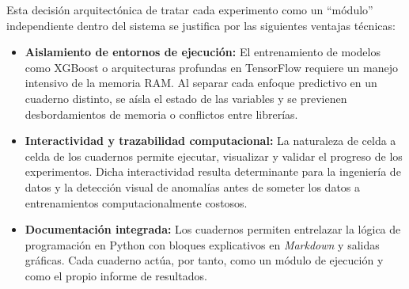 Esta decisión arquitectónica de tratar cada experimento como un ``módulo'' independiente dentro del sistema se justifica por las siguientes ventajas técnicas:
\begin{itemize}
	\item \textbf{Aislamiento de entornos de ejecución:} El entrenamiento de modelos como XGBoost o arquitecturas profundas en TensorFlow requiere un manejo intensivo de la memoria RAM. Al separar cada enfoque predictivo en un cuaderno distinto, se aísla el estado de las variables y se previenen desbordamientos de memoria o conflictos entre librerías.
	\item \textbf{Interactividad y trazabilidad computacional:} La naturaleza de celda a celda de los cuadernos permite ejecutar, visualizar y validar el progreso de los experimentos. Dicha interactividad resulta determinante para la ingeniería de datos y la detección visual de anomalías antes de someter los datos a entrenamientos computacionalmente costosos.
	\item \textbf{Documentación integrada:} Los cuadernos permiten entrelazar la lógica de programación en Python con bloques explicativos en \textit{Markdown} y salidas gráficas. Cada cuaderno actúa, por tanto, como un módulo de ejecución y como el propio informe de resultados.
\end{itemize}

